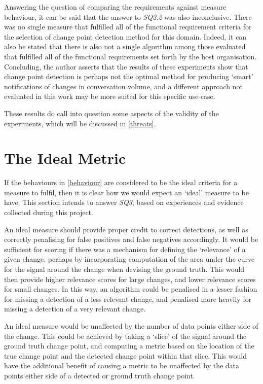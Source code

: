 \documentclass[../main.tex]{subfiles}
\begin{document}
Answering the question of comparing the requirements against measure behaviour, it can be said that the answer to \emph{SQ2.2} was also inconclusive. There was no single measure that fulfilled all of the functional requirement criteria for the selection of change point detection method for this domain. Indeed, it can also be stated that there is also not a single algorithm among those evaluated that fulfilled all of the functional requirements set forth by the host organisation. Concluding, the author asserts that the results of these experiments show that change point detection is perhaps not the optimal method for producing `smart' notifications of changes in conversation volume, and a different approach not evaluated in this work may be more suited for this specific use-case.

These results do call into question some aspects of the validity of the experiments, which will be discussed in \autoref{threats}.

\section{The Ideal Metric}
\label{ideal metric}

If the behaviours in \autoref{behaviour} are considered to be the ideal criteria for a measure to fulfil, then it is clear how we would expect an `ideal' measure to be have. This section intends to answer \emph{SQ3}, based on experiences and evidence collected during this project.

An ideal measure should provide proper credit to correct detections, as well as correctly penalising for false positives and false negatives accordingly. It would be sufficient for scoring if there was a mechanism for defining the `relevance' of a given change, perhaps by incorporating computation of the area under the curve for the signal around the change when devising the ground truth. This would then provide higher relevance scores for large changes, and lower relevance scores for small changes. In this way, an algorithm could be penalised in a lesser fashion for missing a detection of a less relevant change, and penalised more heavily for missing a detection of a very relevant change.

An ideal measure would be unaffected by the number of data points either side of the change. This could be achieved by taking a `slice' of the signal around the ground truth change point, and computing a metric based on the location of the true change point and the detected change point within that slice. This would have the additional benefit of causing a metric to be unaffected by the data points either side of a detected or ground truth change point.
\end{document}
